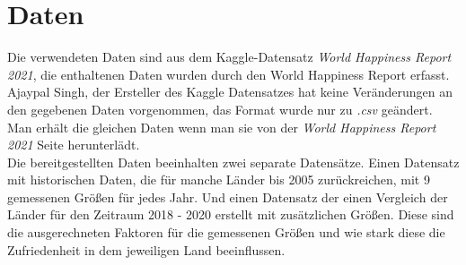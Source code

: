 \section{Daten}

Die verwendeten Daten sind aus dem Kaggle-Datensatz \textit{World Happiness Report 2021}, die enthaltenen Daten wurden durch den World Happiness Report erfasst. Ajaypal Singh, der Ersteller des Kaggle Datensatzes hat keine Veränderungen an den gegebenen Daten vorgenommen, das Format wurde nur zu \textit{.csv} geändert. Man erhält die gleichen Daten wenn man sie von der \textit{World Happiness Report 2021} Seite herunterlädt. \cite{helliwell_world_2021}  \\

Die bereitgestellten Daten beeinhalten zwei separate Datensätze. Einen Datensatz mit historischen Daten, die für manche Länder bis 2005 zurückreichen, mit 9 gemessenen Größen für jedes Jahr. Und einen Datensatz der einen Vergleich der Länder für den Zeitraum 2018 - 2020 erstellt mit zusätzlichen Größen. Diese sind die ausgerechneten Faktoren für die gemessenen Größen und wie stark diese die Zufriedenheit in dem jeweiligen Land beeinflussen. \\

